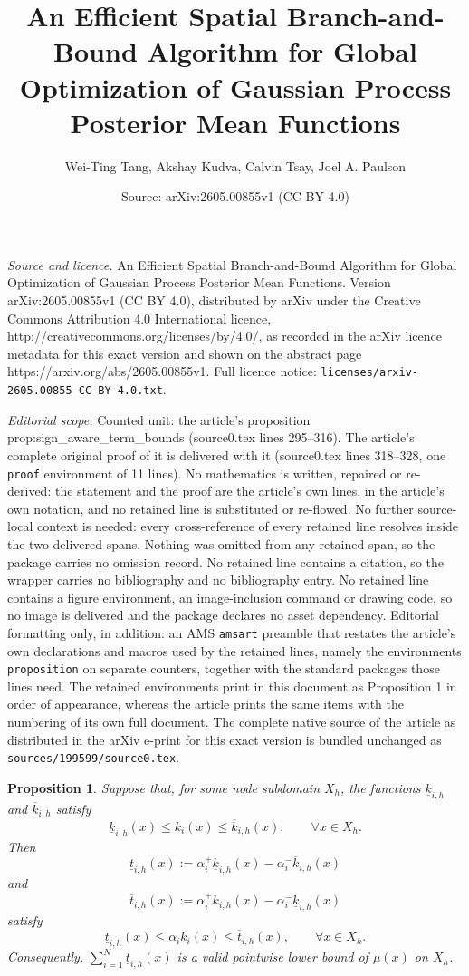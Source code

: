 \documentclass[10pt,a4paper]{amsart}
\title{An Efficient Spatial Branch-and-Bound Algorithm for Global Optimization of Gaussian Process Posterior Mean Functions}
\author{Wei-Ting Tang, Akshay Kudva, Calvin Tsay, Joel A. Paulson}
\date{Source: arXiv:2605.00855v1 (CC BY 4.0)}
\newtheorem{proposition}{Proposition}
\begin{document}
\maketitle

\noindent\emph{Source and licence.} An Efficient Spatial Branch-and-Bound Algorithm for Global Optimization of Gaussian Process Posterior Mean Functions. Version arXiv:2605.00855v1 (CC BY 4.0), distributed by arXiv under the Creative Commons Attribution 4.0 International licence, http://creativecommons.org/licenses/by/4.0/, as recorded in the arXiv licence metadata for this exact version and shown on the abstract page https://arxiv.org/abs/2605.00855v1. Full licence notice: \texttt{licenses/arxiv-2605.00855-CC-BY-4.0.txt}.\par\smallskip

\noindent\textit{Editorial scope.} Counted unit: the article's proposition prop:sign\_aware\_term\_bounds (source0.tex lines 295--316). The article's complete original proof of it is delivered with it (source0.tex lines 318--328, one \texttt{proof} environment of 11 lines). No mathematics is written, repaired or re-derived: the statement and the proof are the article's own lines, in the article's own notation, and no retained line is substituted or re-flowed.  No further source-local context is needed: every cross-reference of every retained line resolves inside the two delivered spans.  Nothing was omitted from any retained span, so the package carries no omission record.  No retained line contains a citation, so the wrapper carries no bibliography and no bibliography entry.  No retained line contains a figure environment, an image-inclusion command or drawing code, so no image is delivered and the package declares no asset dependency.  Editorial formatting only, in addition: an AMS \texttt{amsart} preamble that restates the article's own declarations and macros used by the retained lines, namely the environments \texttt{proposition} on separate counters, together with the standard packages those lines need.  The retained environments print in this document as Proposition 1 in order of appearance, whereas the article prints the same items with the numbering of its own full document.  The complete native source of the article as distributed in the arXiv e-print for this exact version is bundled unchanged as \texttt{sources/199599/source0.tex}.
\begin{proposition}
\label{prop:sign_aware_term_bounds}
Suppose that, for some node subdomain $X_h$, the functions $\underline{k}_{i,h}$ and $\overline{k}_{i,h}$ satisfy
\[
\underline{k}_{i,h}(x)\le k_i(x)\le \overline{k}_{i,h}(x),
\qquad \forall x\in X_h.
\]
Then
\[
\underline{t}_{i,h}(x):=\alpha_i^+\underline{k}_{i,h}(x)-\alpha_i^-\overline{k}_{i,h}(x)
\]
and
\[
\overline{t}_{i,h}(x):=\alpha_i^+\overline{k}_{i,h}(x)-\alpha_i^-\underline{k}_{i,h}(x)
\]
satisfy
\[
\underline{t}_{i,h}(x)\le \alpha_i k_i(x)\le \overline{t}_{i,h}(x),
\qquad \forall x\in X_h.
\]
Consequently, $\sum_{i=1}^N \underline{t}_{i,h}(x)$ is a valid pointwise lower bound of $\mu(x)$ on $X_h$.
\end{proposition}
\end{document}
